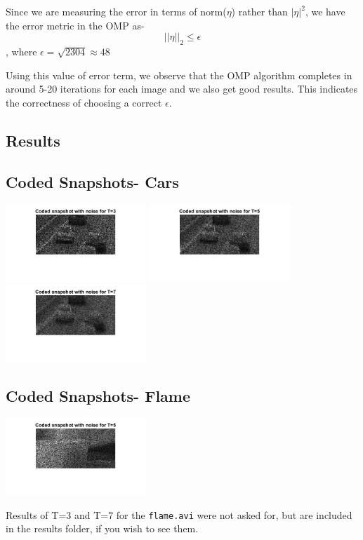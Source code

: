 \documentclass[a4paper,11pt]{article}
\numberwithin{definition}{section}
\numberwithin{mytheorem}{subsection}
\begin{document}
Since we are measuring the error in terms of norm($\eta$) rather than $|\eta|^2$, we have the error metric in the OMP as-
$$ ||\eta||_2 \leq \epsilon$$, where $\epsilon = \sqrt{2304} \approx 48$

Using this value of error term, we observe that the OMP algorithm completes in around 5-20 iterations for each image and we also get good results. This indicates the correctness of choosing a correct $\epsilon$.

\newpage
\subsection{Results}

\subsection{Coded Snapshots- Cars}
\begin{center}
    \includegraphics[width=200px]{"Coded_Snapshot_T=3.png"}
    \includegraphics[width=200px]{"Coded_Snapshot_T=5.png"}
    \includegraphics[width=200px]{"Coded_Snapshot_T=7.png"}
\end{center}

\subsection{Coded Snapshots- Flame}
\begin{center}
    \includegraphics[width=200px]{"fCoded_Snapshot_T=5.png"}
\end{center}
Results of T=3 and T=7 for the \verb|flame.avi| were not asked for, but are included in the results folder, if you wish to see them.
\end{document}
